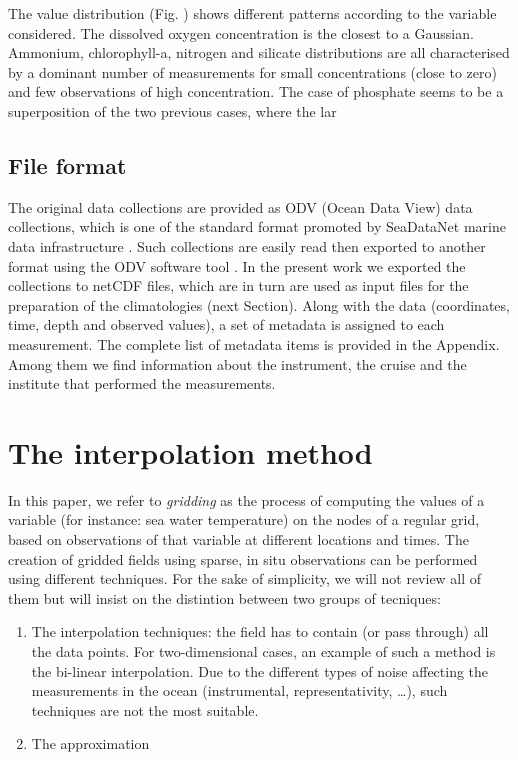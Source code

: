 \documentclass[essd, manuscript]{copernicus}
\begin{document}
The value distribution (Fig. ) shows different patterns according to the variable considered. The dissolved oxygen concentration is the closest to a Gaussian. Ammonium, chlorophyll-a, nitrogen and silicate distributions are all characterised by a dominant number of measurements for small concentrations (close to zero) and few observations of high concentration. The case of phosphate seems to be a superposition of the two previous cases, where the lar


\subsection{File format}
The original data collections are provided as ODV (Ocean Data View) data collections, which is one of the standard format promoted by SeaDataNet marine data
infrastructure \citep{Lowry2023}. Such collections are easily read then exported to another format using the ODV software tool \citep{SCHLITZER2002}. In the present work we exported the collections to netCDF files, which are in turn are used as input files for the preparation of the climatologies (next Section). 
Along with the data (coordinates, time, depth and observed values), a set of metadata is assigned to each measurement. The complete list of metadata items is provided in the Appendix. Among them we find information about the instrument, the cruise and the institute that performed the measurements. 

\section{The interpolation method}

In this paper, we refer to \textit{gridding} as the process of computing the values of a variable (for instance: sea water temperature) on the nodes of a regular grid, based on observations of that variable at different locations and times.
The creation of gridded fields using sparse, in situ observations can be performed using different techniques. For the sake of simplicity, we will not review all of them but will insist on the distintion between two groups of tecniques:
\begin{enumerate}
\item The interpolation techniques: the field has to contain (or pass through) all the data points. For two-dimensional cases, an example of such a method is the bi-linear interpolation. Due to the different types of noise affecting the measurements in the ocean (instrumental, representativity, \ldots), such techniques are not the most suitable.
\item The approximation 
\end{enumerate}
\end{document}
